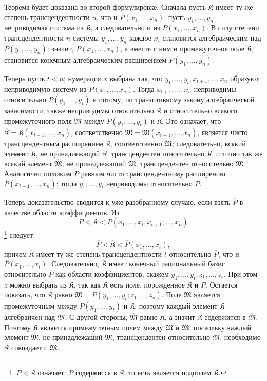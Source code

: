 \documentclass[11pt]{article}
\begin{document}
Теорема будет доказана во второй формулировке. Сначала пусть $\mathfrak K$ имеет ту же степень трансцендентности $n$, что и $P(x_1,\ldots,x_n)$; пусть $y_1,\ldots,y_n$ -- неприводимая система из $\mathfrak K$, а следовательно и из $P(x_1,\ldots,x_n)$. В силу степени трансцендентности $n$ системы $y_1,\ldots,y_n$ каждое $x_i$ становится алгебраическим над $P(y_1,\ldots,y_n)$; значит, $P(x_1,\ldots,x_n)$, а вместе с ним и промежуточное поле $\mathfrak K$, становится конечным алгебраическим расширением $P(y_1,\ldots,y_n)$.

Теперь пусть $t<n$; нумерация $x$ выбрана так, что $y_1,\ldots,y_t,x_{t+1},\ldots,x_n$ образуют неприводимую систему из $P(x_1,\ldots,x_n)$. Тогда $x_{t+1},\ldots,x_n$ неприводимы относительно $P(y_1,\ldots,y_t)$ и потому, по транзитивному закону алгебраической зависимости, также неприводимы относительно $\mathfrak K$ и относительно всякого промежуточного поля $\mathfrak M$ между $P(y_1,\ldots,y_t)$ и $\mathfrak K$. Это означает, что $\overline{\mathfrak K}=\mathfrak K(x_{t+1},\ldots,x_n)$, соответственно $\overline{\mathfrak M}=\mathfrak M(x_{t+1},\ldots,x_n)$, является чисто трансцендентным расширением $\mathfrak K$, соответственно $\mathfrak M$; следовательно, всякий элемент $\overline{\mathfrak K}$, не принадлежащий $\mathfrak K$, трансцендентен относительно $\mathfrak K$, и точно так же всякий элемент $\overline{\mathfrak M}$, не принадлежащий $\mathfrak M$, трансцендентен относительно $\mathfrak M$. Аналогично положим $\overline P$ равным чисто трансцендентному расширению $P(x_{t+1},\ldots,x_n)$; тогда $y_1,\ldots,y_t$ неприводимы относительно $\overline P$.

Теперь доказательство сводится к уже разобранному случаю, если взять $\overline P$ в качестве области коэффициентов. Из
\[
P<\mathfrak K<P(x_1,\ldots,x_t,x_{t+1},\ldots,x_n)
\]
\footnote{$P<\mathfrak K$ означает: $P$ содержится в $\mathfrak K$, то есть является подполем $\mathfrak K$.} следует
\[
\overline P<\overline{\mathfrak K}<\overline P(x_1,\ldots,x_t),
\]
причем $\overline{\mathfrak K}$ имеет ту же степень трансцендентности $t$ относительно $\overline P$, что и $\overline P(x_1,\ldots,x_t)$. Следовательно, $\overline{\mathfrak K}$ имеет конечный рациональный базис относительно $\overline P$ как области коэффициентов, скажем $y_1,\ldots,y_t; z_1,\ldots,z_s$. При этом $z$ можно выбрать из $\mathfrak K$, так как $\overline{\mathfrak K}$ есть поле, порожденное $\mathfrak K$ и $\overline P$. Остается показать, что $\mathfrak K$ равно $\mathfrak M=P(y_1,\ldots,y_t;z_1,\ldots,z_s)$. Поле $\mathfrak M$ является промежуточным между $P(y_1,\ldots,y_t)$ и $\mathfrak K$; поэтому каждый элемент $\mathfrak K$ алгебраичен над $\mathfrak M$. С другой стороны, $\overline{\mathfrak M}$ равно $\overline{\mathfrak K}$, а значит $\mathfrak K$ содержится в $\overline{\mathfrak M}$. Поэтому $\mathfrak K$ является промежуточным полем между $\mathfrak M$ и $\overline{\mathfrak M}$; поскольку каждый элемент $\overline{\mathfrak M}$, не принадлежащий $\mathfrak M$, трансцендентен относительно $\mathfrak M$, необходимо $\mathfrak K$ совпадает с $\mathfrak M$.
\end{document}
